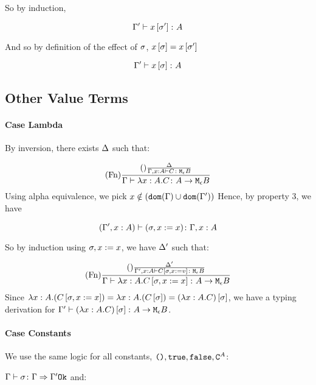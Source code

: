 \documentclass{report}
\begin{document}
        So by induction,

        \begin{equation}
            \Gamma' \vdash x\left[\sigma'\right] \colon A
        \end{equation}

        And so by definition of the effect of $\sigma$, $x\left[\sigma\right] = x\left[\sigma'\right]$

        \begin{equation}
            \Gamma' \vdash x\left[\sigma\right] \colon A
        \end{equation}
\subsection{Other Value Terms}
\paragraph{Case Lambda}
    By inversion, there exists $\Delta$ such that:

    \begin{equation}
        (\text{Fn}) \frac{
            (\text{}) \frac{\Delta}{\Gamma, x:A  \vdash C \colon \texttt{M}_{\epsilon}{B}}
        }{\Gamma \vdash \lambda x : A. C \colon A \rightarrow \texttt{M}_{\epsilon}{B}}
    \end{equation}
    Using alpha equivalence, we pick $x\notin(\texttt{dom}(\Gamma)\cup\texttt{dom}(\Gamma'))$
    Hence, by property 3, we have

    \begin{equation}
        (\Gamma', x:A ) \vdash (\sigma, x:= x) \colon \Gamma, x: A
    \end{equation}

    So by induction using $\sigma,x:= x$, we have $\Delta'$ such that:

    \begin{equation}
        (\text{Fn}) \frac{
            (\text{}) \frac{\Delta'}{\Gamma', x:A  \vdash C\left[\sigma, x:= v\right] \colon \texttt{M}_{\epsilon}{B}}
        }{\Gamma \vdash \lambda x : A. C\left[\sigma, x:={x}\right] \colon A \rightarrow \texttt{M}_{\epsilon}{B}}
    \end{equation} 
    Since $\lambda x : A. (C\left[\sigma, x:={x}\right]) = {\lambda x : A. ({C\left[\sigma\right]})} = (\lambda x : A. C)\left[\sigma\right]$, we have a typing derivation for $\Gamma' \vdash (\lambda x : A. C)\left[\sigma\right] \colon A \rightarrow \texttt{M}_{\epsilon}{B}$.

\paragraph{Case Constants}
    We use the same logic for all constants, $\texttt{()},\texttt{true},\texttt{false},\texttt{C}^{A}$:

    $\Gamma \vdash \sigma \colon \Gamma \Rightarrow \Gamma' \texttt{Ok}$ and:
\end{document}
